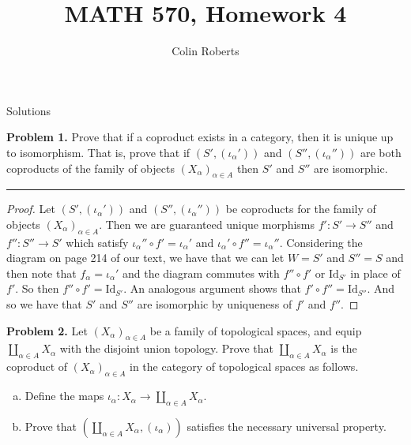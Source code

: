\documentclass[leqno]{article}
\author{Colin Roberts}
\title{MATH 570, Homework 4}
\theoremstyle{nonumberplain}
\newtheorem{proof}{Proof}
\begin{document}
\maketitle
\begin{large}
\begin{center}
Solutions
\end{center}
\end{large}
\pagebreak


\noindent\textbf{Problem 1.} Prove that if a coproduct exists in a category, then it is unique up to isomorphism. That is, prove that if $(S',(\iota_\alpha '))$ and $(S'',(\iota_\alpha ''))$ are both coproducts of the family of objects $(X_\alpha)_{\alpha\in A}$ then $S'$ and $S''$ are isomorphic. 

\noindent\rule[0.5ex]{\linewidth}{1pt}

\begin{proof} 
Let $(S',(\iota_\alpha ' ))$ and $(S'',(\iota_\alpha ''))$ be coproducts for the family of objects $(X_\alpha)_{\alpha \in A}$.  Then we are guaranteed unique morphisms $f'\colon S'\to S''$ and $f'' \colon S'' \to S'$ which satisfy $\iota_\alpha'' \circ f' = \iota_\alpha'$ and $\iota_\alpha' \circ f'' = \iota_\alpha''$.  Considering the diagram on page 214 of our text, we have that we can let $W=S'$ and $S''=S$ and then note that $f_\alpha = \iota_\alpha'$ and the diagram commutes with $f''\circ f'$ or $\textrm{Id}_{S'}$ in place of $f'$.  So then $f''\circ f'=\textrm{Id}_{S'}$.  An analogous argument shows that $f'\circ f'' = \textrm{Id}_{S''}$. And so we have that $S'$ and $S''$ are isomorphic by uniqueness of $f'$ and $f''$.
\end{proof}

\pagebreak



\noindent\textbf{Problem 2.} Let $(X_\alpha)_{\alpha \in A}$ be a family of topological spaces, and equip $\coprod_{\alpha \in A} X_\alpha$ with the disjoint union topology. Prove that $\coprod_{\alpha \in A} X_\alpha$ is the coproduct of $(X_\alpha)_{\alpha\in A}$ in the category of topological spaces as follows.
\begin{enumerate}[(a)]
\item Define the maps $\iota_\alpha \colon X_\alpha \to \coprod_{\alpha \in A} X_\alpha$. 
\item Prove that $(\coprod_{\alpha \in A} X_\alpha, (\iota_\alpha))$ satisfies the necessary universal property.
\end{enumerate}
\end{document}

